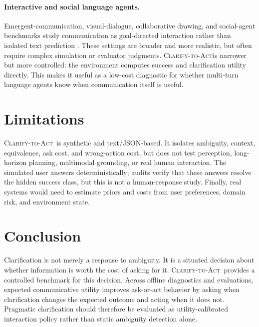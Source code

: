 \documentclass{article} %
\newcommand{\task}{\textsc{Clarify-to-Act}}
\begin{document}
\paragraph{Interactive and social language agents.}
Emergent-communication, visual-dialogue, collaborative drawing, and social-agent benchmarks study communication as goal-directed interaction rather than isolated text prediction \citep{lazaridou2017multi,devries2017guesswhat,kim2019codraw,zhou2024sotopia}. These settings are broader and more realistic, but often require complex simulation or evaluator judgments. \task is narrower but more controlled: the environment computes success and clarification utility directly. This makes it useful as a low-cost diagnostic for whether multi-turn language agents know when communication itself is useful.

\section{Limitations}

\task\ is synthetic and text/JSON-based. It isolates ambiguity, context, equivalence, ask cost, and wrong-action cost, but does not test perception, long-horizon planning, multimodal grounding, or real human interaction. The simulated user answers deterministically; audits verify that these answers resolve the hidden success class, but this is not a human-response study. Finally, real systems would need to estimate priors and costs from user preferences, domain risk, and environment state.

\section{Conclusion}

Clarification is not merely a response to ambiguity. It is a situated decision about whether information is worth the cost of asking for it. \task\ provides a controlled benchmark for this decision. Across offline diagnostics and evaluations, expected communicative utility improves ask-or-act behavior by asking when clarification changes the expected outcome and acting when it does not. Pragmatic clarification should therefore be evaluated as utility-calibrated interaction policy rather than static ambiguity detection alone.



\end{document}
